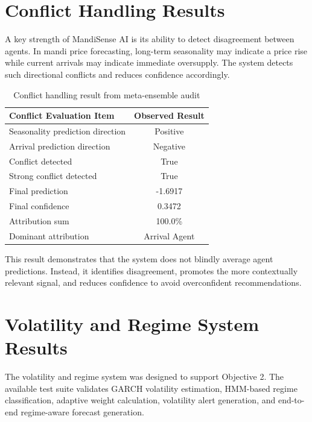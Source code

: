\documentclass[12pt,a4paper]{report}
\begin{document}
\section{Conflict Handling Results}

A key strength of MandiSense AI is its ability to detect disagreement between agents. In mandi price forecasting, long-term seasonality may indicate a price rise while current arrivals may indicate immediate oversupply. The system detects such directional conflicts and reduces confidence accordingly.

\begin{table}[H]
\centering
\caption{Conflict handling result from meta-ensemble audit}
\label{tab:conflict_result}
\begin{tabular}{|p{6cm}|c|}
\hline
\textbf{Conflict Evaluation Item} & \textbf{Observed Result} \\
\hline
Seasonality prediction direction & Positive \\
\hline
Arrival prediction direction & Negative \\
\hline
Conflict detected & True \\
\hline
Strong conflict detected & True \\
\hline
Final prediction & -1.6917 \\
\hline
Final confidence & 0.3472 \\
\hline
Attribution sum & 100.0\% \\
\hline
Dominant attribution & Arrival Agent \\
\hline
\end{tabular}
\end{table}

This result demonstrates that the system does not blindly average agent predictions. Instead, it identifies disagreement, promotes the more contextually relevant signal, and reduces confidence to avoid overconfident recommendations.

\section{Volatility and Regime System Results}

The volatility and regime system was designed to support Objective 2. The available test suite validates GARCH volatility estimation, HMM-based regime classification, adaptive weight calculation, volatility alert generation, and end-to-end regime-aware forecast generation.
\end{document}
